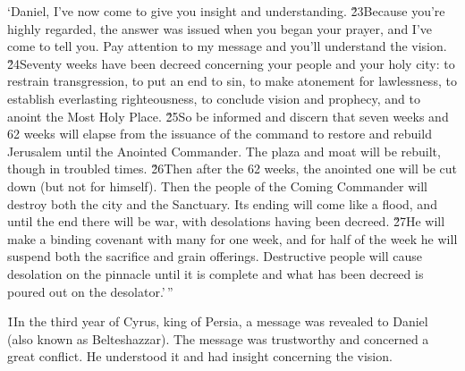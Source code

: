 \begin{poetry}
\poeml `Daniel, I've now come to give you insight and understanding. \v{23}Because you're highly regarded, the answer was issued when you began your prayer, and I've come to tell you. Pay attention to my message and you'll understand the vision. \v{24}Seventy weeks have been decreed concerning your people and your holy city: to restrain transgression, to put an end to sin, to make atonement for lawlessness, to establish everlasting righteousness, to conclude vision and prophecy, and to anoint the Most Holy Place. \v{25}So be informed and discern that seven weeks and 62 weeks will elapse from the issuance of the command to restore and rebuild Jerusalem until the Anointed Commander. The plaza and moat will be rebuilt, though in troubled times. \v{26}Then after the 62 weeks, the anointed one will be cut down (but not for himself). Then the people of the Coming Commander will destroy both the city and the Sanctuary. Its ending will come like a flood, and until the end there will be war, with desolations having been decreed. \v{27}He will make a binding covenant with many for one week, and for half of the week he will suspend both the sacrifice and grain offerings. Destructive people will cause desolation on the pinnacle until it is complete and what has been decreed is poured out on the desolator.'\,''
\end{poetry}

\v{1}In the third year of Cyrus, king of Persia, a message was revealed to Daniel (also known as Belteshazzar). The message was trustworthy and concerned a great conflict. He understood it and had insight concerning the vision.

